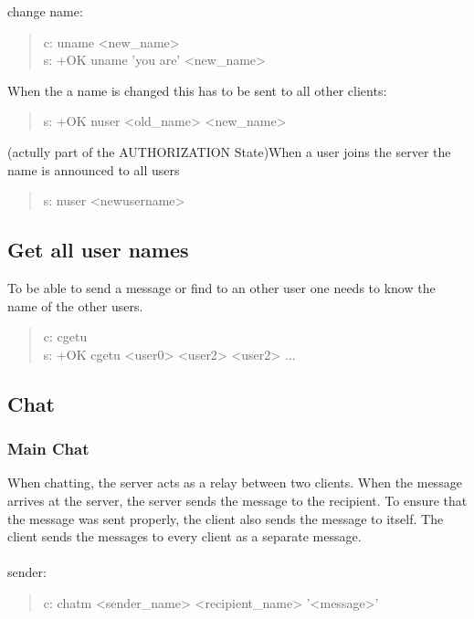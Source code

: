 \documentclass[a4paper,11pt]{article}
\begin{document}
\noindent
change name:
\begin{quote}
  c: uname <new\_name>\\
  s: +OK uname 'you are' <new\_name>
\end{quote}

\noindent
When the a name is changed this has to be sent to all other clients:\\
\begin{quote}
  s: +OK nuser <old\_name> <new\_name>
\end{quote}

\noindent
(actully part of the AUTHORIZATION State)When a user joins the server the name is announced to all users
\begin{quote}
  s: nuser <newusername> 
\end{quote}


\subsection{Get all user names}
To be able to send a message or find to an other user one needs to know the name of the other users.
\begin{quote}
  c: cgetu\\
  s: +OK cgetu <user0> <user2> <user2> ...
\end{quote} 
\clearpage
\subsection{Chat}

\subsubsection{Main Chat}
When chatting, the server acts as a relay between two clients. When the message arrives at the server, the server sends the message to the recipient. To ensure that the message was sent properly, the client also sends the message to itself. The client sends the messages to every client as a separate message.\\\\

\noindent
sender:
\begin{quote}
  c: chatm <sender\_name> <recipient\_name> '<message>'\\ %
\end{quote}
\end{document}
